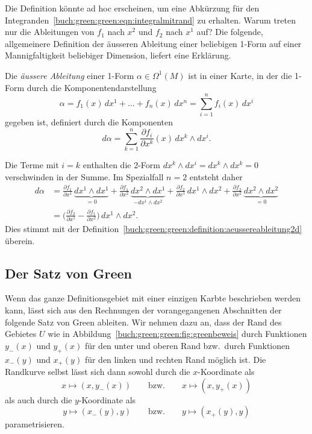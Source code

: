 Die Definition könnte ad hoc erscheinen, um eine Abkürzung für den
Integranden~\eqref{buch:green:green:eqn:integralmitrand} zu erhalten.
Warum treten nur die Ableitungen von $f_1$ nach $x^2$ und
$f_2$ nach $x^1$ auf?
Die folgende, allgemeinere Definition der äusseren Ableitung 
einer beliebigen 1-Form auf einer Mannigfaltigkeit beliebiger 
Dimension, liefert eine Erklärung.

\begin{definition}
Die {\em äussere Ableitung} einer 1-Form $\alpha\in\Omega^1(M)$ ist
in einer Karte, in der die 1-Form durch die Komponentendarstellung
\[
\alpha
=
f_1(x)\,dx^1 + \dots + f_n(x)\, dx^n
=
\sum_{i=1}^n f_i(x)\,dx^i
\]
gegeben ist,
definiert durch die Komponenten
\[
d\alpha
=
\sum_{k=1}^n
\frac{\partial f_i}{\partial x^k}(x)
\,dx^k\wedge dx^i.
\]
\end{definition}

Die Terme mit $i=k$ enthalten die 2-Form $dx^k\wedge dx^i=dx^k\wedge dx^k=0$
verschwinden in der Summe.
Im Spezialfall $n=2$ entsteht daher
\begin{align*}
d\alpha
&=
\frac{\partial f_1}{\partial x^1}\,\underbrace{dx^1\wedge dx^1}_{\displaystyle=0}
+
\frac{\partial f_1}{\partial x^2}\,\underbrace{dx^2\wedge dx^1}_{\displaystyle-dx^1\wedge dx^2}
+
\frac{\partial f_2}{\partial x^1}\,dx^1\wedge dx^2
+
\frac{\partial f_2}{\partial x^2}\,\underbrace{dx^2\wedge dx^2}_{\displaystyle=0}
\\
&=
\biggl(
\frac{\partial f_2}{\partial x^1}
-
\frac{\partial f_1}{\partial x^2}
\biggr)
\,dx^1\wedge dx^2.
\end{align*}
Dies stimmt mit der
Definition~\ref{buch:green:green:definition:aeussereableitung2d}
überein.

%
%
\subsection{Der Satz von Green}
Wenn das ganze Definitionsgebiet mit einer einzigen Karbte beschrieben
werden kann, lässt sich aus den Rechnungen der vorangegangenen
Abschnitten der folgende Satz von Green ableiten.
Wir nehmen dazu an, dass der Rand des Gebietes $U$ wie in
Abbildung~\ref{buch:green:green:fig:greenbeweis}
durch Funktionen $y_-(x)$ und $y_+(x)$ für den unter und oberen Rand
bzw.~durch Funktionen $x_-(y)$ und $x_+(y)$ für den linken und rechten
Rand möglich ist.
Die Randkurve selbst lässt sich dann sowohl durch die $x$-Koordinate
als
\[
x\mapsto (x,y_-(x)) 
\qquad\text{bzw.}\qquad
x\mapsto (x,y_+(x)) 
\]
als auch durch die $y$-Koordinate als
\[
y\mapsto (x_-(y),y) 
\qquad\text{bzw.}\qquad
y\mapsto (x_+(y),y) 
\]
parametrisieren.
%

